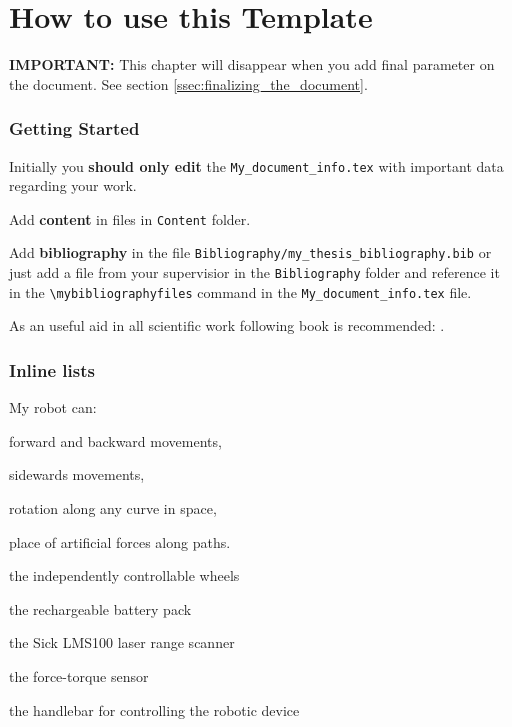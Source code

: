 \chapter{How to use this Template}
\label{sec:how-to-use}

\textbf{IMPORTANT:} This chapter will disappear when you add final parameter on the document. See section \ref{ssec:finalizing_the_document}.

\subsection{Getting Started}
Initially you \textbf{should only edit} the \texttt{My\_document\_info.tex} with important data regarding your work.

Add \textbf{content} in files in \texttt{Content} folder.

Add \textbf{bibliography} in the file \texttt{Bibliography/my\_thesis\_bibliography.bib} or just add a file from your supervisior in the \texttt{Bibliography} folder and reference it in the \texttt{\textbackslash mybibliographyfiles} command in the \texttt{My\_document\_info.tex} file.

As an useful aid in all scientific work following book is recommended: \cite{deininger2005studien}.


\subsection{Inline lists}
My robot can:
\begin{enumerate*}[label=(\roman*)]
 \item forward and backward movements,
 \item sidewards movements,
 \item rotation along any curve in space,
 \item place of artificial forces along paths.
\end{enumerate*}

\begin{enumerate*}[label=(\arabic*),itemjoin={{; }}]
    \item the independently controllable wheels
    \item the rechargeable battery pack
    \item the Sick LMS100 laser range scanner
    \item the force-torque sensor
    \item the handlebar for controlling the robotic device
\end{enumerate*}

